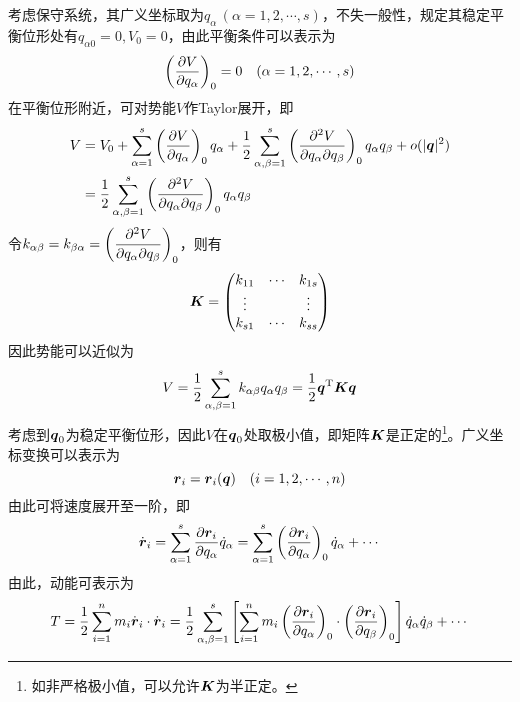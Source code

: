 考虑保守系统，其广义坐标取为$q_\alpha\,(\alpha=1,2,\cdots,s)$，不失一般性，规定其稳定平衡位形处有$q_{\alpha 0} = 0,V_0 = 0$，由此平衡条件可以表示为
\begin{equation}
	\left(\frac{\partial V}{\partial q_\alpha}\right)_0 = 0 \quad (\alpha = 1,2,\cdots,s)
\end{equation}
在平衡位形附近，可对势能$V$作Taylor展开，即
\begin{align*}
	V & = V_0 + \sum_{\alpha=1}^s \left(\dfrac{\partial V}{\partial q_\alpha}\right)_0 q_\alpha + \frac12 \sum_{\alpha,\beta=1}^s \left(\frac{\partial^2 V}{\partial q_\alpha \partial q_\beta}\right)_0 q_\alpha q_\beta + o(|\boldsymbol{q}|^2) \\
	& = \frac12 \sum_{\alpha,\beta=1}^s \left(\frac{\partial^2 V}{\partial q_\alpha \partial q_\beta}\right)_0 q_\alpha q_\beta
\end{align*}
令$k_{\alpha\beta} = k_{\beta\alpha} = \left(\dfrac{\partial^2 V}{\partial q_\alpha \partial q_\beta}\right)_0$，则有
\begin{equation*}
	\boldsymbol{K} = \begin{pmatrix} k_{11} & \cdots & k_{1s} \\ \vdots & & \vdots \\ k_{s1} & \cdots & k_{ss} \end{pmatrix}
\end{equation*}
因此势能可以近似为
\begin{equation}
	V = \frac12 \sum_{\alpha,\beta=1}^s k_{\alpha\beta}q_\alpha q_\beta = \frac12 \boldsymbol{q}^{\mathrm{T}} \boldsymbol{K} \boldsymbol{q}
\end{equation}
考虑到$\boldsymbol{q}_0$为稳定平衡位形，因此$V$在$\boldsymbol{q}_0$处取极小值，即矩阵$\boldsymbol{K}$是正定的\footnote{如非严格极小值，可以允许$\boldsymbol{K}$为半正定。}。广义坐标变换可以表示为
\begin{equation*}
	\boldsymbol{r}_i = \boldsymbol{r}_i(\boldsymbol{q}) \quad (i=1,2,\cdots,n)
\end{equation*}
由此可将速度展开至一阶，即
\begin{equation*}
	\dot{\boldsymbol{r}}_i = \sum_{\alpha=1}^s \frac{\partial \boldsymbol{r}_i}{\partial q_\alpha} \dot{q}_\alpha = \sum_{\alpha=1}^s \left(\frac{\partial \boldsymbol{r}_i}{\partial q_\alpha}\right)_0 \dot{q}_\alpha + \cdots
\end{equation*}
由此，动能可表示为
\begin{equation}
	T = \frac12 \sum_{i=1}^n m_i \dot{\boldsymbol{r}}_i \cdot \dot{\boldsymbol{r}}_i = \frac12 \sum_{\alpha,\beta=1}^s \left[\sum_{i=1}^n m_i \left(\frac{\partial \boldsymbol{r}_i}{\partial q_\alpha}\right)_0 \cdot \left(\frac{\partial \boldsymbol{r}_i}{\partial q_\beta}\right)_0 \right] \dot{q}_\alpha \dot{q}_\beta + \cdots
\end{equation}
